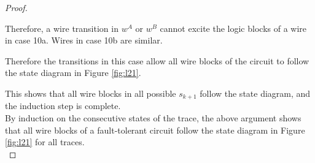 \documentclass[12pt]{report}
\begin{document}
\begin{proof}
\begin{itemize}
\begin{itemize}
 Therefore, a wire transition in $w^A$ or $w^B$ cannot excite the logic blocks of a wire in case 10a.  Wires in case 10b are similar.
\end{itemize}
Therefore the transitions in this case allow all wire blocks of the circuit to follow the state diagram in Figure \ref{fig:l21}.\\


\end{itemize}
This shows that all wire blocks in all possible $s_{k+1}$ follow the state diagram, and the induction step is complete.\\
By induction on the consecutive states of the trace, the above argument shows that all wire blocks of a fault-tolerant circuit follow the state diagram in Figure \ref{fig:l21} for all traces. \\
\end{proof}
\end{document}
